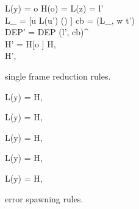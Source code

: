 \begin{figure}[h]
  \RuleSpace{}

  {L(y) = o \andalso H(o) =  \andalso L(z) = l' \\
  L_{} = [u \mapsto L(u') \mid () \in {}]
  \andalso cb = (L_{}, w \Rightarrow t') \\
  \iota{} \andalso DEP' = DEP \cup (l', cb)^\iota \\
  H' = H[o \mapsto {}] }
  { H,  \\ \FRedTo \;
  H',  }
  \caption{\RACL{} single frame reduction rules.}
  \label{fig:frame_red_rules}
\end{figure}


\begin{figure}
  {L(y) = \NullVal}
  {H,  \; \FRedTo \; \Error}

  \RuleSpace{}

  {L(y) = \NullVal}
  {H,  \; \FRedTo \; \Error}

  \RuleSpace{}

  {L(y) = \NullVal}
  {H,  \; \FRedTo \; \Error}

  \RuleSpace{}

  {L(y) = \NullVal}
  {H,  \; \FRedTo \; \Error}

  \RuleSpace{}

  {L(y) = \NullVal}
  {H,   \\ \FRedTo \; \Error}
  \caption{\RACL{} error spawning rules.}
  \label{fig:error_red_rules}
\end{figure}

